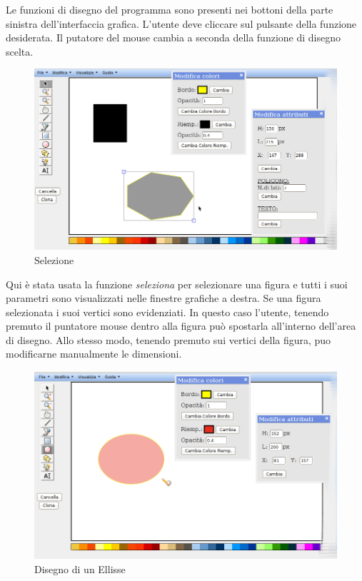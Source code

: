Le funzioni di disegno del programma sono presenti nei bottoni della parte sinistra dell'interfaccia grafica. L'utente deve cliccare sul pulsante della funzione desiderata. Il putatore del mouse cambia a seconda della funzione di disegno scelta.

\begin{figure}[!ht]
\centering
\includegraphics[scale=4]{images/selezione.png}
\caption{Selezione}
\end{figure} 

Qui \`e stata usata la funzione \textit{seleziona} per selezionare una figura e tutti i suoi parametri sono visualizzati nelle finestre grafiche a destra. Se una figura  selezionata i suoi vertici sono evidenziati. In questo caso l'utente, tenendo premuto il puntatore mouse dentro alla figura pu\`o spostarla all'interno dell'area di disegno. Allo stesso modo, tenendo premuto sui vertici della figura, puo modificarne manualmente le dimensioni.

\begin{figure}[!ht]
\centering
\includegraphics[scale=4]{images/ellisse.png}
\caption{Disegno di un Ellisse}
\end{figure} 

